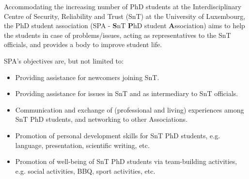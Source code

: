 \label{ssec_SPSA}
Accommodating the increasing number of PhD students at the Interdisciplinary Centre of Security, Reliability and Trust (SnT) at the University of Luxembourg, the PhD student association (SPA - \textbf{S}nT \textbf{P}hD student \textbf{A}ssociation) aims to help the students in case of problems/issues, acting as representatives to the SnT officials, and provides a body to improve student life. 

SPA's objectives are, but not limited to:
\begin{itemize}
	\item Providing assistance for newcomers joining SnT.
	\item Providing assistance for issues in SnT and as intermediary to SnT officials. 
	\item Communication and exchange of (professional and living) experiences among SnT PhD students, and networking to other Associations.
	\item Promotion of personal development skills for SnT PhD students, e.g. language, presentation, scientific writing, etc.
	\item Promotion of well-being of SnT PhD students via team-building activities, e.g. social activities, BBQ, sport activities, etc. 
\end{itemize}

